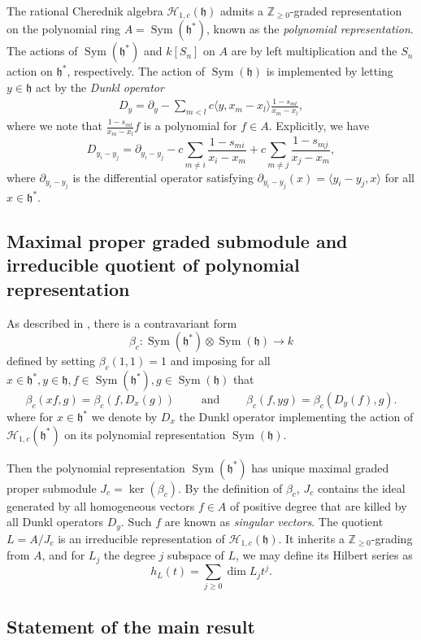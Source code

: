 \documentclass{amsart}
\numberwithin{equation}{section}
\theoremstyle{definition}
\newcommand{\ZZ}{\mathbb{Z}}
\newcommand{\h}{\mathfrak{h}}
\newcommand{\HH}{\mathcal{H}}
\newcommand{\Sym}{\operatorname{Sym}}
\begin{document}
The rational Cherednik algebra $\HH_{1, c}(\h)$ admits a $\ZZ_{\geq 0}$-graded representation on the polynomial ring $A = \Sym(\h^*)$, known as the \textit{polynomial representation}.  The actions of $\Sym(\h^*)$ and $k[S_n]$ on $A$ are by left multiplication and the $S_n$ action on $\h^*$, respectively.  The action of $\Sym(\h)$ is implemented by letting $y \in \h$ act by the \textit{Dunkl operator}
\begin{align*}
D_y =  \partial_y  - \sum_{m < l} c  \langle y, x_m-x_l \rangle \frac{1-s_{ml}}{x_m - x_l},
\end{align*}
where we note that $\frac{1-s_{ml}}{x_m - x_l}f$ is a polynomial for $f \in A$. Explicitly, we have  
\[
D_{y_i - y_j} =  \partial_{y_i-y_j}-c\sum_{m \ne i} \frac{1-s_{mi}}{x_i-x_m}+c\sum_{m \ne j} \frac{1-s_{mj}}{x_j-x_m},
\] \noindent
where $\partial_{y_i-y_j}$ is the differential operator satisfying $\partial_{y_i-y_j}(x) = \langle y_i-y_j,x\rangle$ for all $x \in \h^*$.  

\subsection{Maximal proper graded submodule and irreducible quotient of polynomial representation}

As described in \cite[Section 2.5]{BC1}, there is a contravariant form 
\[
\beta_c: \Sym(\h^*) \otimes \Sym(\h) \to k
\]
defined by setting $\beta_c(1, 1) = 1$ and imposing for all $x \in \h^*, y \in \h, f \in \Sym(\h^*), g \in \Sym(\h)$ that
\[
\beta_c(xf,g)=\beta_c(f,D_x(g)) \qquad \text{ and } \qquad \beta_c(f,yg) = \beta_c(D_y(f),g).
\]
where for $x \in \h^*$ we denote by $D_x$ the Dunkl operator implementing the action of $\HH_{1, c}(\h^*)$ on its polynomial representation $\Sym(\h)$. 

Then the polynomial representation $\Sym(\h^*)$ has unique maximal graded proper submodule $J_c = \ker(\beta_c)$.  By the definition of $\beta_c$, $J_c$ contains the ideal generated by all homogeneous vectors $f \in A$ of positive degree that are killed by all Dunkl operators $D_y$.  Such $f$ are known as \textit{singular vectors}.  The quotient $L = A/J_c$ is an irreducible representation of $\HH_{1,c}(\h)$.  It inherits a $\ZZ_{\geq 0}$-grading from $A$, and for $L_j$ the degree $j$ subspace of $L$, we may define its Hilbert series as
\[
h_L(t) = \sum_{j \geq 0} \dim L_j t^j.
\]

\subsection{Statement of the main result}
\end{document}
